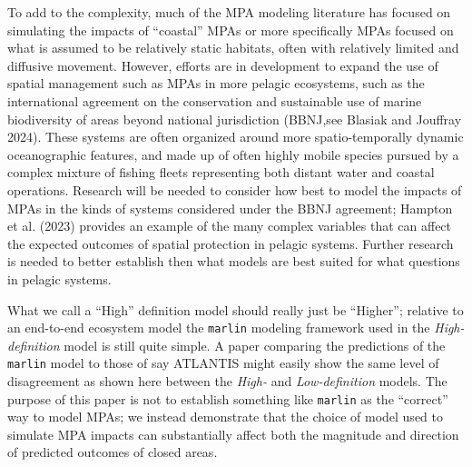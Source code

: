 \documentclass[
  default,
  lineno,
  referee]{sn-jnl}
\begin{document}
To add to the complexity, much of the MPA modeling literature has
focused on simulating the impacts of ``coastal'' MPAs or more
specifically MPAs focused on what is assumed to be relatively static
habitats, often with relatively limited and diffusive movement. However,
efforts are in development to expand the use of spatial management such
as MPAs in more pelagic ecosystems, such as the international agreement
on the conservation and sustainable use of marine biodiversity of areas
beyond national jurisdiction (BBNJ,see Blasiak and Jouffray 2024). These
systems are often organized around more spatio-temporally dynamic
oceanographic features, and made up of often highly mobile species
pursued by a complex mixture of fishing fleets representing both distant
water and coastal operations. Research will be needed to consider how
best to model the impacts of MPAs in the kinds of systems considered
under the BBNJ agreement; Hampton et al. (2023) provides an example of
the many complex variables that can affect the expected outcomes of
spatial protection in pelagic systems. Further research is needed to
better establish then what models are best suited for what questions in
pelagic systems.

What we call a ``High'' definition model should really just be
``Higher''; relative to an end-to-end ecosystem model the
\texttt{marlin} modeling framework used in the \emph{High-definition}
model is still quite simple. A paper comparing the predictions of the
\texttt{marlin} model to those of say ATLANTIS might easily show the
same level of disagreement as shown here between the \emph{High-} and
\emph{Low-definition} models. The purpose of this paper is not to
establish something like \texttt{marlin} as the ``correct'' way to model
MPAs; we instead demonstrate that the choice of model used to simulate
MPA impacts can substantially affect both the magnitude and direction of
predicted outcomes of closed areas.
\end{document}
